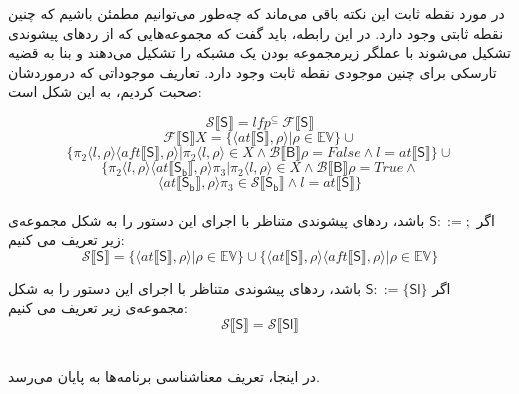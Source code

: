 \begin{defn}
	در مورد نقطه ثابت این نکته باقی می‌ماند که چه‌طور می‌توانیم مطمئن باشیم که چنین نقطه ثابتی وجود دارد. در این رابطه، باید گفت که مجموعه‌هایی که از ردهای پیشوندی تشکیل می‌شوند با عملگر زیرمجموعه بودن یک مشبکه را تشکیل می‌دهند و بنا به قضیه تارسکی\cite{tarski} برای چنین موجودی نقطه ثابت وجود دارد.
	تعاریف موجوداتی که درموردشان صحبت کردیم، به این شکل است:
	
	$$\mathcal{S} \llbracket\mathsf{S}\rrbracket = lfp^{\subseteq}\: \mathcal{F\llbracket\mathsf{S}\rrbracket}      $$ $$\mathcal{F} \llbracket\mathsf{S}\rrbracket X= \{ \langle at\llbracket\mathsf{S}\rrbracket , \rho \rangle | \rho \in \mathbb{EV}       \} \cup $$
	$$  \{ \pi_2 \langle l ,\rho \rangle \langle aft\llbracket\mathsf{S}\rrbracket,\rho \rangle |  \pi_2 \langle l ,\rho \rangle \in X \wedge \mathcal{B}\llbracket\mathsf{B}\rrbracket\rho=False \wedge l= at\llbracket\mathsf{S}\rrbracket   \} \cup      $$
	$$  \{ \pi_2 \langle l ,\rho \rangle \langle at\llbracket\mathsf{S_b}\rrbracket,\rho \rangle \pi_3 |  \pi_2 \langle l ,\rho \rangle \in X \wedge \mathcal{B}\llbracket\mathsf{B}\rrbracket\rho=True \wedge$$$$  \langle at\llbracket\mathsf{S_b}\rrbracket,\rho \rangle \pi_3 \in  \mathcal{S} \llbracket\mathsf{S_b}\rrbracket   \wedge   l= at\llbracket\mathsf{S}\rrbracket  \}  $$\\
	
	اگر $         \mathsf{S} ::=;  $ باشد، ردهای پیشوندی متناظر با اجرای این دستور را به شکل مجموعه‌ی زیر تعریف می کنیم:
	$$\mathcal{S} \llbracket\mathsf{S}\rrbracket = \{ \langle at\llbracket\mathsf{S}\rrbracket , \rho \rangle | \rho \in \mathbb{EV}       \} \cup     \{ \langle at\llbracket\mathsf{S}\rrbracket , \rho \rangle \langle aft\llbracket\mathsf{S}\rrbracket , \rho \rangle | \rho \in \mathbb{EV}       \}             $$  
	
	
	اگر $         \mathsf{S} ::=\{\mathsf{Sl}\}  $ باشد، ردهای پیشوندی متناظر با اجرای این دستور را به شکل مجموعه‌ی زیر تعریف می کنیم:
	$$\mathcal{S} \llbracket\mathsf{S}\rrbracket = \mathcal{S} \llbracket\mathsf{Sl}\rrbracket $$   \\
\end{defn}
در اینجا، تعریف معناشناسی برنامه‌ها به پایان می‌رسد.


